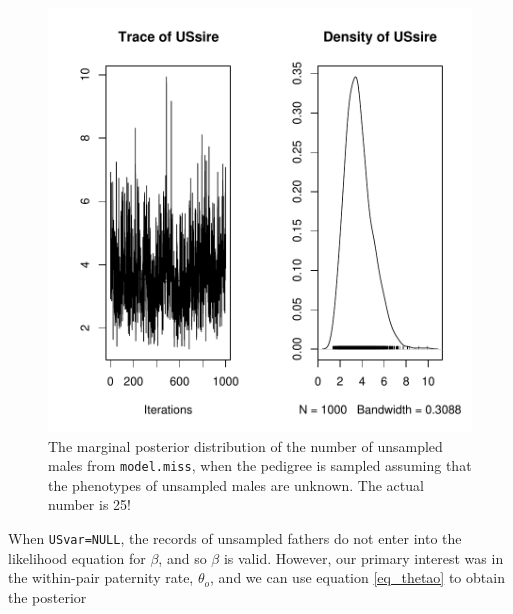 \documentclass{article}
\begin{document}
\begin{figure}[!h]
\begin{center}
\includegraphics{Tutorial-072}
\end{center}
\caption{The marginal posterior distribution of the number of unsampled males from \texttt{model.miss}, when the pedigree is sampled assuming that the phenotypes of unsampled males are unknown. The actual number is 25!}
\label{EPP1US-fig}
\end{figure}

When \texttt{USvar=NULL}, the records of unsampled fathers do not enter into the likelihood equation for $\beta$, and so $\beta$ is valid.  However, our primary interest was in the within-pair paternity rate, $\theta_{o}$, and we can use equation \ref{eq_thetao} to obtain the posterior

\begin{Schunk}
\end{Schunk}
\end{document}

